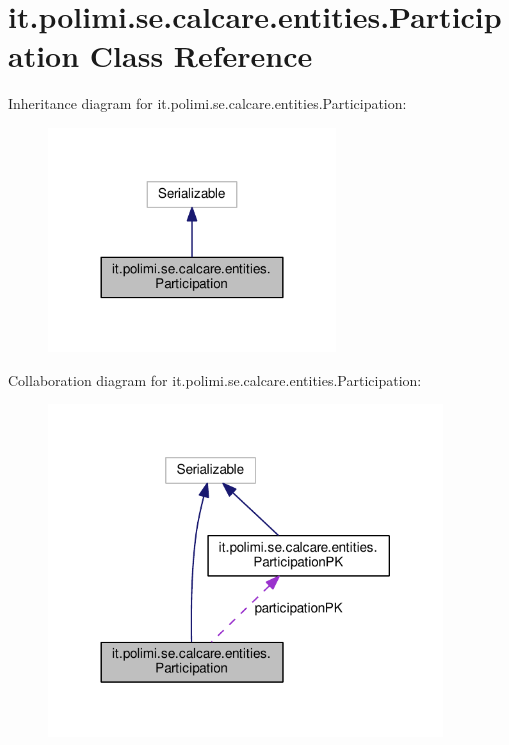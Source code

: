 \hypertarget{classit_1_1polimi_1_1se_1_1calcare_1_1entities_1_1Participation}{}\section{it.\+polimi.\+se.\+calcare.\+entities.\+Participation Class Reference}
\label{classit_1_1polimi_1_1se_1_1calcare_1_1entities_1_1Participation}


Inheritance diagram for it.\+polimi.\+se.\+calcare.\+entities.\+Participation\+:
\nopagebreak
\begin{figure}[H]
\begin{center}
\leavevmode
\includegraphics[width=216pt]{classit_1_1polimi_1_1se_1_1calcare_1_1entities_1_1Participation__inherit__graph}
\end{center}
\end{figure}


Collaboration diagram for it.\+polimi.\+se.\+calcare.\+entities.\+Participation\+:
\nopagebreak
\begin{figure}[H]
\begin{center}
\leavevmode
\includegraphics[width=296pt]{classit_1_1polimi_1_1se_1_1calcare_1_1entities_1_1Participation__coll__graph}
\end{center}
\end{figure}
